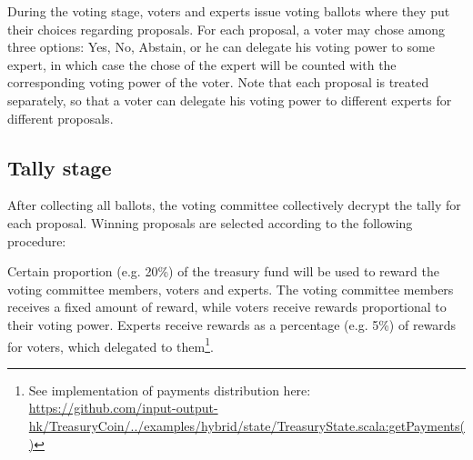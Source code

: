 During the voting stage, voters and experts issue voting ballots where they put their choices regarding proposals. For each proposal, a voter may chose among three options: Yes, No, Abstain, or he can delegate his voting power to some expert, in which case the chose of the expert will be counted with the corresponding voting power of the voter.
Note that each proposal is treated separately, so that a voter can delegate his voting power to different experts for different proposals.

\subsection{Tally stage}
After collecting all ballots, the voting committee collectively decrypt the tally for each proposal. Winning proposals are selected according to the following procedure:

Certain proportion (e.g. 20\%) of the treasury fund will be used to reward the voting committee members, voters and experts. The voting committee members receives a fixed amount of reward, while voters receive rewards proportional to their voting power. Experts receive rewards as a percentage (e.g. 5\%) of rewards for voters, which delegated to them\footnote{See implementation of payments distribution here:\\ \href{https://github.com/input-output-hk/TreasuryCoin/blob/master/examples/src/main/scala/examples/hybrid/state/TreasuryState.scala\#L537}{https://github.com/input-output-hk/TreasuryCoin/../examples/hybrid/state/TreasuryState.scala:getPayments()}}.